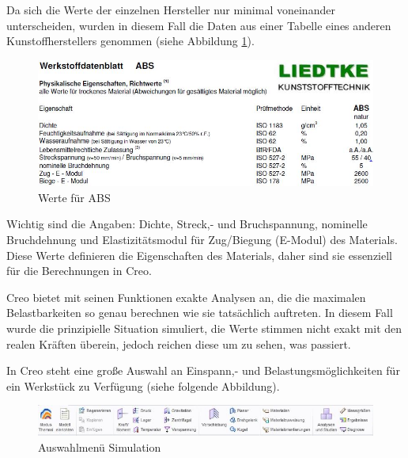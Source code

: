 	Da sich die Werte der einzelnen Hersteller nur minimal voneinander unterscheiden,
	wurden in diesem Fall die Daten aus einer Tabelle eines anderen Kunstoffherstellers genommen (siehe Abbildung \ref{werte_abs}).

			\begin{figure}[H]
			\begin{centering}
			\includegraphics[width = 1\textwidth]{Bilder/werte_abs}
			\par\end{centering}
			\caption[Werte ABS]{Werte für ABS\cite{werte_abs}}
			\label{werte_abs}
			\end{figure}

	Wichtig sind die Angaben: Dichte, Streck,- und Bruchspannung, nominelle Bruchdehnung und Elastizitätsmodul für Zug/Biegung (E-Modul) des Materials.
	Diese Werte definieren die Eigenschaften des Materials, daher sind sie essenziell für die Berechnungen in Creo.

	Creo bietet mit seinen Funktionen exakte Analysen an, die die maximalen Belastbarkeiten so genau berechnen wie sie tatsächlich auftreten.
	In diesem Fall wurde die prinzipielle Situation simuliert, die Werte stimmen nicht exakt mit den realen Kräften überein, jedoch reichen diese um zu sehen, was passiert.

	In Creo steht eine große Auswahl an Einspann,- und Belastungsmöglichkeiten für ein Werkstück zu Verfügung (siehe folgende Abbildung).

			\begin{figure}[H]
			\begin{centering}
			\includegraphics[width = 1\textwidth]{Bilder/auswahl_creo}
			\par\end{centering}
			\caption{Auswahlmenü Simulation}
			\label{auswahl_creo}
			\end{figure}


